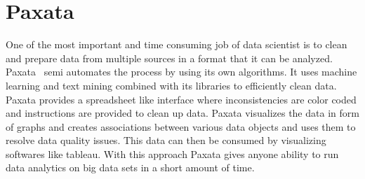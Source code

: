\section{Paxata}

One of the most important and time consuming job of data scientist is
to clean and prepare data from multiple sources in a format that it
can be analyzed. Paxata~\cite{hid-sp18-413-paxata} semi automates the
process by using its own algorithms. It uses machine learning and text
mining combined with its libraries to efficiently clean data. Paxata
provides a spreadsheet like interface where inconsistencies are color
coded and instructions are provided to clean up data. Paxata
visualizes the data in form of graphs and creates associations between
various data objects and uses them to resolve data quality
issues. This data can then be consumed by visualizing softwares like
tableau. With this approach Paxata gives anyone ability to run data
analytics on big data sets in a short amount of time.
